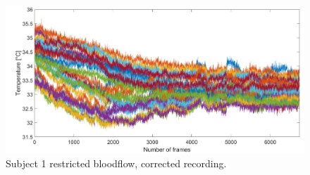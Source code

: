 \begin{figure}[htbp]
\begin{minipage}[b]{0.45\linewidth}
	\end{minipage}
	\hspace{0.2cm}
	\begin{minipage}[b]{0.45\linewidth}
		\centering
		\includegraphics[width=\linewidth]{figures/Recordings/Sub1_cuffed_corr}
		\caption{Subject 1 restricted bloodflow, corrected recording.}
		
	\end{minipage}
\end{figure}


